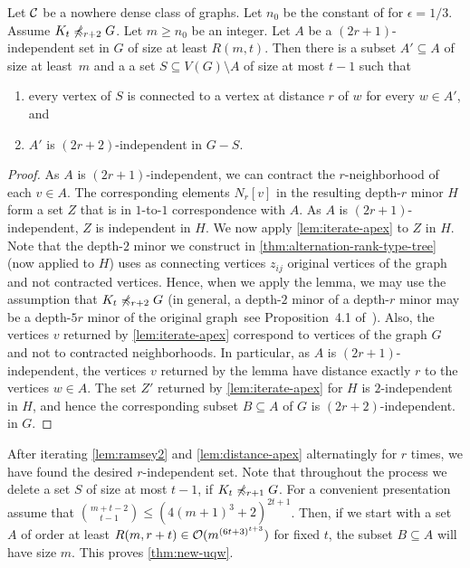 \begin{lemma}\label{lem:distance-apex}
Let $\mathcal{C}$ be a nowhere dense class of graphs. 
Let $n_0$ be the constant of for $\epsilon=1/3$. 
Assume $K_t\not\preccurlyeq_{r+2} G$. 
Let $m\geq n_0$ be an integer. 
Let $A$ be a $(2r+1)$-independent set in $G$ of size at least $R(m,t)$. 
Then there is a subset $A'\subseteq A$ of size at least~$m$ and a 
a set $S\subseteq V(G)\setminus A$ of size at most $t-1$ such that
\begin{enumerate}
\item every vertex of $S$ is connected to a vertex at distance $r$ of $w$ for 
every $w\in A'$, and
\item $A'$ is $(2r+2)$-independent in $G-S$. 
\end{enumerate} 
\end{lemma}
\begin{proof}
As $A$ is $(2r+1)$-independent, we can contract the $r$-neighborhood
of each $v\in A$. The corresponding elements $N_r[v]$ in the resulting 
depth-$r$ minor $H$ form a set $Z$ that is in $1$-to-$1$ correspondence 
with $A$. As $A$
is $(2r+1)$-independent, $Z$ is independent in $H$. We now apply 
\cref{lem:iterate-apex} to $Z$ in $H$. Note that the depth-$2$ minor
we construct in \cref{thm:alternation-rank-type-tree} (now applied to $H$) 
uses as connecting vertices $z_{ij}$ original vertices of the graph and
not contracted vertices. Hence, when we apply the lemma, we may 
use the assumption that $K_t\not\preccurlyeq_{r+2} G$ (in general, 
a depth-$2$ minor of a depth-$r$ minor may be a depth-$5r$ minor
of the original graph~see Proposition~4.1 of~\cite{sparsity}). 
Also, the vertices $v$ returned by 
\cref{lem:iterate-apex} correspond to vertices of the graph $G$ and not
to contracted neighborhoods. In particular, as $A$ is $(2r+1)$-independent, 
the vertices $v$ returned by the lemma have distance exactly $r$ to 
the vertices $w\in A$. The set $Z'$ returned by \cref{lem:iterate-apex}
for $H$ is $2$-independent in $H$, and hence the corresponding 
subset $B\subseteq A$ of $G$ is $(2r+2)$-independent. 
in $G$. 
\end{proof}

After iterating \cref{lem:ramsey2} and \cref{lem:distance-apex} 
alternatingly
for $r$ times, we have found the desired $r$-independent set. Note
that throughout the process we delete a set $S$ of size at most
$t-1$, if $K_t\not\preccurlyeq_{r+1} G$. For a convenient presentation
assume that $\binom{m+t-2}{t-1}\leq (4(m+1)^3+2)^{2t+1}$. 
Then, if we start with a set $A$ of order at least 
$R(m,r+t)\in\mathcal{O}(m^{(6t+3)^{t+3}})$ for fixed $t$, the 
subset $B\subseteq A$ will have size $m$. This proves \cref{thm:new-uqw}. 